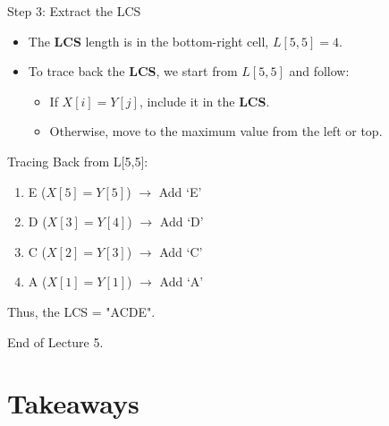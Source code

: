 \documentclass{beamer}
\begin{document}
\begin{frame}{Step 3: Extract the LCS}
    \begin{itemize}
        \item The \textbf{LCS} length is in the bottom-right cell, $L[5,5] = 4$.
        \item To trace back the \textbf{LCS}, we start from $L[5,5]$ and follow:
        \begin{itemize}
            \item If $X[i] = Y[j]$, include it in the \textbf{LCS}.
            \item Otherwise, move to the maximum value from the left or top.
        \end{itemize}
    \end{itemize}

    Tracing Back from L[5,5]:
    \begin{enumerate}
        \item E ($X[5] = Y[5]$) $\longrightarrow$ Add `E'
        \item D ($X[3] = Y[4]$) $\longrightarrow$ Add `D'
        \item C ($X[2] = Y[3]$) $\longrightarrow$ Add `C'
        \item A ($X[1] = Y[1]$) $\longrightarrow$ Add `A'
    \end{enumerate}
    Thus, the LCS = "ACDE".
\end{frame}











\begin{frame}{}
\end{frame}

\begin{frame}{}
\end{frame}

\begin{frame}{}
    \centering
    \Huge End of Lecture 5.
\end{frame}

\section*{Takeaways}
\end{document}

